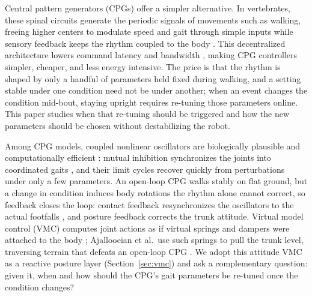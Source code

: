 \documentclass[letterpaper, 10 pt, conference]{ieeeconf}  %
\begin{document}
Central pattern generators (CPGs) offer a simpler alternative. In vertebrates, these spinal circuits generate the periodic signals of movements such as walking, freeing higher centers to modulate speed and gait through simple inputs while sensory feedback keeps the rhythm coupled to the body \cite{goulding2009circuits, dickinson2000how}. This decentralized architecture lowers command latency and bandwidth \cite{ijspeert2008special}, making CPG controllers simpler, cheaper, and less energy intensive. The price is that the rhythm is shaped by only a handful of parameters held fixed during walking, and a setting stable under one condition need not be under another; when an event changes the condition mid-bout, staying upright requires re-tuning those parameters online. This paper studies when that re-tuning should be triggered and how the new parameters should be chosen without destabilizing the robot.


Among CPG models, coupled nonlinear oscillators are biologically plausible and computationally efficient \cite{collins1994hard, ijspeert2008special}: mutual inhibition synchronizes the joints into coordinated gaits \cite{collins1994hard, sprowitz2008passive, righetti2008pattern}, and their limit cycles recover quickly from perturbations \cite{sprowitz2008passive} under only a few parameters. An open-loop CPG walks stably on flat ground, but a change in condition induces body rotations the rhythm alone cannot correct, so feedback closes the loop: contact feedback resynchronizes the oscillators to the actual footfalls \cite{righetti2008pattern}, and posture feedback corrects the trunk attitude. Virtual model control (VMC) computes joint actions as if virtual springs and dampers were attached to the body \cite{pratt2001virtual}; Ajallooeian et al.~use such springs to pull the trunk level, traversing terrain that defeats an open-loop CPG \cite{ajallooeian2013central}. We adopt this attitude VMC as a reactive posture layer (Section~\ref{sec:vmc}) and ask a complementary question: given it, when and how should the CPG's gait parameters be re-tuned once the condition changes?
\end{document}
